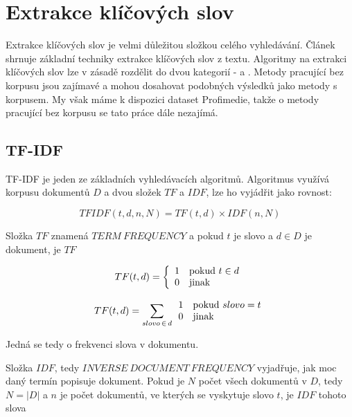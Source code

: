 \section{Extrakce klíčových slov}

Extrakce klíčových slov je velmi důležitou složkou celého vyhledávání. Článek \cite{lott} shrnuje základní techniky extrakce klíčových slov z textu. Algoritmy na extrakci klíčových slov lze v zásadě rozdělit do dvou kategorií -  a . Metody pracující bez korpusu jsou zajímavé a mohou dosahovat podobných výsledků jako metody s korpusem. My však máme k dispozici dataset Profimedie, takže o metody pracující bez korpusu se tato práce dále nezajímá. 

\subsection{TF-IDF}

TF-IDF je jeden ze základních vyhledávacích algoritmů. Algoritmus využívá korpusu dokumentů $D$ a dvou složek $TF$ a $IDF$, lze ho vyjádřit jako rovnost: 

\begin{equation}
  TFIDF(t,d,n,N)= TF(t,d)\times IDF(n,N)
\end{equation}

Složka $TF$ znamená $TERM\ FREQUENCY$ a pokud $t$ je slovo a $d \in D$ je dokument, je $TF$

\begin{equation}
 TF(t,d) = \left\{ \begin{array}{l l} 1 & \mathrm{pokud}\ t \in d \\
  0 & \mathrm{jinak} \end{array} \right.
\end{equation}

\begin{equation}
 TF(t,d) = \sum_{slovo\,\in\,d} \begin{array}{l l} 1 & \mathrm{pokud}\ slovo = t \\
  0 & \mathrm{jinak} \end{array}
\end{equation}

Jedná se tedy o frekvenci slova v dokumentu.

Složka $IDF$, tedy $INVERSE\ DOCUMENT\ FREQUENCY$ vyjadřuje, jak moc daný termín popisuje dokument. Pokud je $N$ počet všech dokumentů v $D$, tedy $N = |D|$ a $n$ je počet dokumentů, ve kterých se vyskytuje slovo $t$, je $IDF$ tohoto slova

